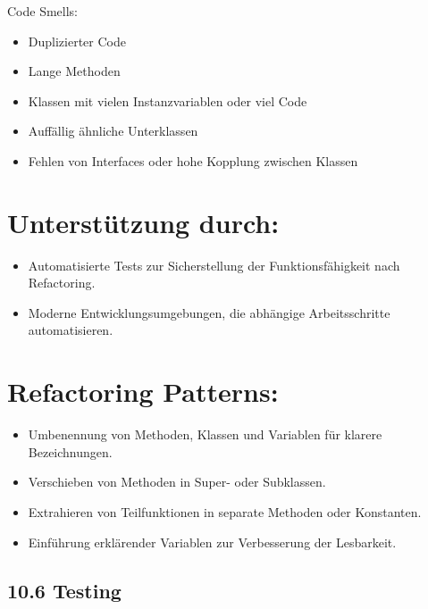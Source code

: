 \documentclass[10pt]{article}
\begin{document}
Code Smells:

\begin{itemize}
  \item Duplizierter Code
  \item Lange Methoden
  \item Klassen mit vielen Instanzvariablen oder viel Code
  \item Auffällig ähnliche Unterklassen
  \item Fehlen von Interfaces oder hohe Kopplung zwischen Klassen
\end{itemize}

\section*{Unterstützung durch:}
\begin{itemize}
  \item Automatisierte Tests zur Sicherstellung der Funktionsfähigkeit nach Refactoring.
  \item Moderne Entwicklungsumgebungen, die abhängige Arbeitsschritte automatisieren.
\end{itemize}

\section*{Refactoring Patterns:}
\begin{itemize}
  \item Umbenennung von Methoden, Klassen und Variablen für klarere Bezeichnungen.
  \item Verschieben von Methoden in Super- oder Subklassen.
  \item Extrahieren von Teilfunktionen in separate Methoden oder Konstanten.
  \item Einführung erklärender Variablen zur Verbesserung der Lesbarkeit.
\end{itemize}

\subsection*{10.6 Testing}
\end{document}

